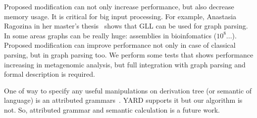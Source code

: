 \documentclass[runningheads,a4paper]{llncs}
\begin{document}
Proposed modification can not only increase performance, but also decrease memory usage. 
It is critical for big input processing.
For example, Anastasia Ragozina in her master's thesis~\cite{!!!} shows that GLL can be used for graph parsing.  
In some areas graphs can be really huge: assemblies in bioinfomatics ($10^8$...).
Proposed modification can improve performance not only in case of classical parsing, but in graph parsing too. 
We perform some tests that shows performance increasing in metagenomic analysis, but full integration with graph parsing and formal description is required.

One of way to specify any useful manipulations on derivation tree (or semantic of language) is an attributed grammars~\cite{!!!}.
YARD supports it but our algorithm is not.
So, attributed grammar and semantic calculation is a future work.





\end{document}

